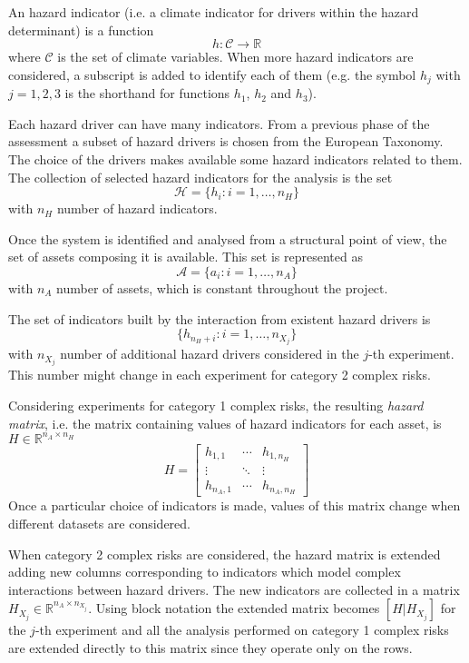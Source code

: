 \documentclass{article}
\begin{document}
An hazard indicator (i.e. a climate indicator for drivers within the hazard determinant) is a function
\begin{equation}
  \label{eq:indicator}
  h : \mathcal{C} \to \mathbb{R}
\end{equation}
where $\mathcal{C}$ is the set of climate variables. When more hazard indicators are considered, a subscript is added to identify each of them (e.g. the symbol $h_j$ with $j = 1, 2, 3$ is the shorthand for functions $h_1$, $h_2$ and $h_3$).

Each hazard driver can have many indicators. From a previous phase of the assessment a subset of hazard drivers is chosen from the European Taxonomy\cite[438]{2024EU20212139}. The choice of the drivers makes available some hazard indicators related to them.
The collection of selected hazard indicators for the analysis is the set
\begin{equation}
  \mathcal{H} = \{ h_i : i = 1, \dots, n_H \}
\end{equation}
with $n_H$ number of hazard indicators.

Once the system is identified and analysed from a structural point of view, the set of assets composing it is available. This set is represented as
\begin{equation}
  \mathcal{A} = \{ a_i : i = 1, \dots, n_A \}
\end{equation}
with $n_A$ number of assets, which is constant throughout the project.

The set of indicators built by the interaction from existent hazard drivers is
\begin{equation}
  \{ h_{n_H + i} : i = 1, \dots, n_{X_j} \}
\end{equation}
with $n_{X_j}$ number of additional hazard drivers considered in the $j$-th experiment. This number might change in each experiment for category 2 complex risks.

Considering experiments for category 1 complex risks, the resulting \emph{hazard matrix}, i.e. the matrix containing values of hazard indicators for each asset, is $H \in \mathbb{R}^{n_A \times n_H}$
\begin{equation}
  H =
  \begin{bmatrix}
    h_{1, 1}   & \cdots & h_{1, n_H}   \\
    \vdots     & \ddots & \vdots       \\
    h_{n_A, 1} & \cdots & h_{n_A, n_H}
  \end{bmatrix}
\end{equation}
Once a particular choice of indicators is made, values of this matrix change when different datasets are considered.

When category 2 complex risks are considered, the hazard matrix is extended adding new columns corresponding to indicators which model complex interactions between hazard drivers. The new indicators are collected in a matrix $H_{X_j} \in \mathbb{R}^{n_A \times n_{X_j}}$.
Using block notation the extended matrix becomes $[H | H_{X_j}]$ for the $j$-th experiment and all the analysis performed on category 1 complex risks are extended directly to this matrix since they operate only on the rows.
\end{document}
